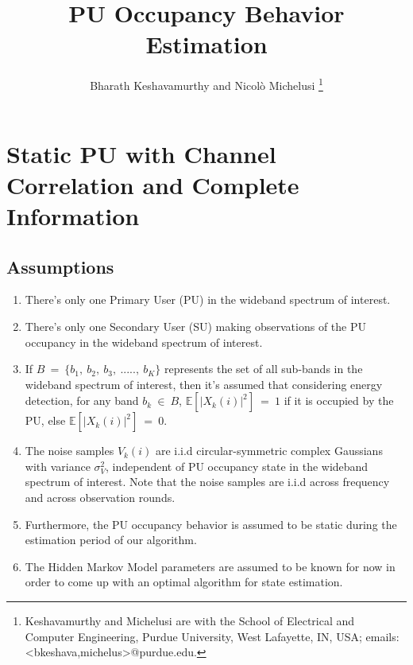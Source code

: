 \documentclass[12pt, draftcls, onecolumn]{IEEEtran}
\begin{document}
 
\title{PU Occupancy Behavior Estimation}
\author{Bharath Keshavamurthy and Nicol\`{o} Michelusi
\thanks{Keshavamurthy and Michelusi are with the School of Electrical and Computer Engineering, Purdue University, West Lafayette, IN, USA; emails:<bkeshava,michelus>@purdue.edu.}}
\maketitle
{}
\maketitle
\section{Static PU with Channel Correlation and Complete Information}
\subsection{Assumptions}
\begin{enumerate}
    \item There's only one Primary User (PU) in the wideband spectrum of interest.
    \item There's only one Secondary User (SU) making observations of the PU occupancy in the wideband spectrum of interest.
    \item If $B\ =\ \{b_1,\ b_2,\ b_3,\ .....,\ b_K\}$ represents the set of all sub-bands in the wideband spectrum of interest, then it's assumed that considering energy detection, for any band $b_k\ \in\ B$, $\mathbb E[|X_k(i)|^2]\ =\ 1$ if it is occupied by the PU, else $\mathbb E[|X_k(i)|^2]\ =\ 0$.
    \item The noise samples $V_k(i)$ are i.i.d circular-symmetric complex Gaussians with variance $\sigma_V^2$, independent of PU occupancy state in the wideband spectrum of interest. Note that the noise samples are i.i.d across frequency and across observation rounds.
    \item Furthermore, the PU occupancy behavior is assumed to be static during the estimation period of our algorithm.
    \item The Hidden Markov Model parameters are assumed to be known for now in order to come up with an optimal algorithm for state estimation.
\end{enumerate}
\end{document}
